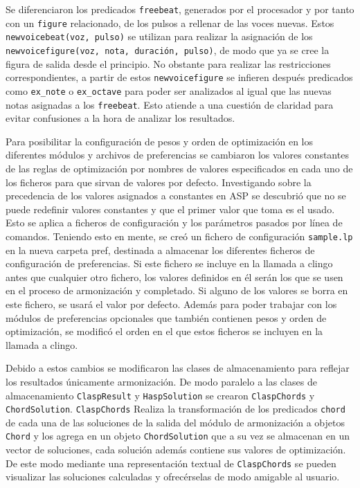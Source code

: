Se diferenciaron los predicados \texttt{freebeat}, generados por el procesador y por tanto con un \texttt{figure} relacionado, de los pulsos a rellenar de las voces nuevas. Estos \texttt{newvoicebeat(voz, pulso)} se utilizan para realizar la asignación de los \texttt{newvoicefigure(voz, nota, duración, pulso)}, de modo que ya se cree la figura de salida desde el principio. No obstante para realizar las restricciones correspondientes, a partir de estos \texttt{newvoicefigure} se infieren después predicados como \texttt{ex\_note} o \texttt{ex\_octave} para poder ser analizados al igual que las nuevas notas asignadas a los \texttt{freebeat}. Esto atiende a una cuestión de claridad para evitar confusiones a la hora de analizar los resultados.
	
Para posibilitar la configuración de pesos y orden de optimización en los diferentes módulos y archivos de preferencias se cambiaron los valores constantes de las reglas de optimización por nombres de valores especificados en cada uno de los ficheros para que sirvan de valores por defecto. Investigando sobre la precedencia de los valores asignados a constantes en ASP se descubrió que no se puede redefinir valores constantes y que el primer valor que toma es el usado. Esto se aplica a ficheros de configuración y los parámetros pasados por línea de comandos. Teniendo esto en mente, se creó un fichero de configuración \texttt{sample.lp} en la nueva carpeta pref, destinada a almacenar los diferentes ficheros de configuración de preferencias. Si este fichero se incluye en la llamada a clingo antes que cualquier otro fichero, los valores definidos en él serán los que se usen en el proceso de armonización y completado. Si alguno de los valores se borra en este fichero, se usará el valor por defecto. Además para poder trabajar con los módulos de preferencias opcionales que también contienen pesos y orden de optimización, se modificó el orden en el que estos ficheros se incluyen en la llamada a clingo.

Debido a estos cambios se modificaron las clases de almacenamiento para reflejar los resultados únicamente armonización. De modo paralelo a las clases de almacenamiento \texttt{ClaspResult} y \texttt{HaspSolution} se crearon \texttt{ClaspChords} y \texttt{ChordSolution}. \texttt{ClaspChords} Realiza la transformación de los predicados \texttt{chord} de cada una de las soluciones de la salida del módulo de armonización a objetos \texttt{Chord} y los agrega en un objeto \texttt{ChordSolution} que a su vez se almacenan en un vector de soluciones, cada solución además contiene sus valores de optimización. De este modo mediante una representación textual de \texttt{ClaspChords} se pueden visualizar las soluciones calculadas y ofrecérselas de modo amigable al usuario.

